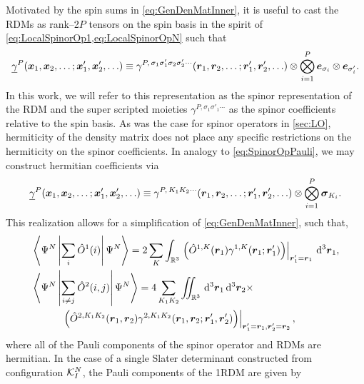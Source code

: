 Motivated by the spin sums in \cref{eq:GenDenMatInner}, it is useful to cast the RDMs as rank--2$P$ tensors on the spin basis in the spirit of 
\cref{eq:LocalSpinorOp1,eq:LocalSpinorOpN} such that
\begin{equation}
  \label{eq:RDMSpinBasis}
  \underline{\gamma}^P(\boldsymbol{x}_1,\boldsymbol{x}_2,\ldots;\boldsymbol{x}'_1,\boldsymbol{x}'_2,\ldots ) \equiv 
    \gamma^{P,\,\sigma_1\sigma'_1\sigma_2\sigma'_2\cdots}(\boldsymbol{r}_1,\boldsymbol{r}_2,\ldots;\boldsymbol{r}'_1,\boldsymbol{r}'_2,\ldots ) 
    \otimes \bigotimes_{i=1}^P \boldsymbol{e}_{\sigma_i} \otimes \boldsymbol{e}_{\sigma_i'}.
\end{equation}
In this work, we will refer to this representation as the spinor representation of the RDM and the
super scripted moieties $\gamma^{P,\sigma_1\sigma'_1\cdots}$ as the spinor coefficients relative to
the spin basis.
As was the case for spinor operators in \cref{sec:LO}, hermiticity of the density matrix does not
place any specific restrictions on the hermiticity on the spinor coefficients.
In analogy to \cref{eq:SpinorOpPauli}, we may construct hermitian coefficients via
\begin{equation}
  \underline{\gamma}^P(\boldsymbol{x}_1,\boldsymbol{x}_2,\ldots;\boldsymbol{x}'_1,\boldsymbol{x}'_2,\ldots ) \equiv 
    \gamma^{P,\,K_1 K_2 \cdots}(\boldsymbol{r}_1,\boldsymbol{r}_2,\ldots;\boldsymbol{r}'_1,\boldsymbol{r}'_2,\ldots ) 
    \otimes \bigotimes_{i=1}^P \boldsymbol{\sigma}_{K_i}.
\end{equation}
This realization allows for a simplification of  \cref{eq:GenDenMatInner}, such that, 
\begin{subequations}
  \label{eq:SpinBasisDenMatInner}
\begin{align}
&\left\langle \Psi^N \left\vert \sum_i \hat{O}^1(i) \right\vert \Psi^N \right\rangle = 2 \sum_K \int_{\mathbb R^3} \left.\left( \hat{O}^{1,K}(\boldsymbol{r}_1) \gamma^{1,K}(\boldsymbol{r}_1;\boldsymbol{r}'_1) \right) 
  \right \vert_{\boldsymbol{r}'_1 = \boldsymbol{r}_1} \,\mathrm{d}^3\boldsymbol{r}_1,\\
&\left\langle \Psi^N \left\vert \sum_{i\neq j} \hat{O}^2(i,j) \right\vert \Psi^N \right\rangle = 4 \sum_{K_1 K_2} \int\mkern-12mu\int_{\mathbb R^3} \,\mathrm{d}^3\boldsymbol{r}_1 \,\mathrm{d}^3\boldsymbol{r}_2 \nonumber \times \\ &\qquad \quad
  \left.\left( \hat{O}^{2,K_1K_2}(\boldsymbol{r}_1,\boldsymbol{r}_2) \gamma^{2,K_1 K_2}(\boldsymbol{r}_1,\boldsymbol{r}_2;\boldsymbol{r}'_1,\boldsymbol{r}'_2) \right) 
  \right \vert_{\boldsymbol{r}'_1 = \boldsymbol{r}_1, \boldsymbol{r}'_2 = \boldsymbol{r}_2},
\end{align}
\end{subequations}
where all of the Pauli components of the spinor operator and RDMs are hermitian. In the case of a single Slater 
determinant constructed from configuration $\mathcal{K}^N_I$, the Pauli components of the 1RDM are given by
